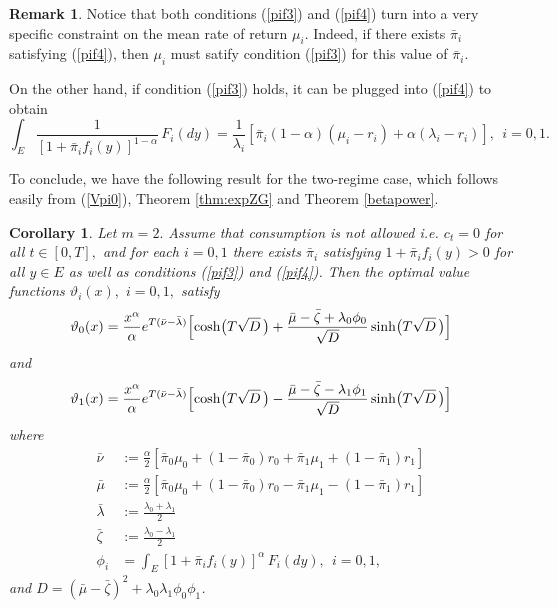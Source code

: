 \documentclass[11pt]{article}
\theoremstyle{plain}
\newtheorem{corollary}[theorem]{Corollary}
\theoremstyle{definition}
\newtheorem{remark}[theorem]{Remark}
\numberwithin{equation}{section}
\begin{document}
\begin{remark}
Notice that both conditions (\ref{pif3}) and (\ref{pif4}) turn into a very specific constraint on the mean rate of return $\mu_i.$ Indeed, if there exists $\bar\pi_i$ satisfying (\ref{pif4}), then $\mu_i$ must satify condition (\ref{pif3}) for this value of $\bar\pi_i.$

On the other hand, if condition (\ref{pif3}) holds, it can be plugged into (\ref{pif4}) to obtain
\begin{equation*}
\int_E \frac{1}{[1+\bar\pi_i f_i(y)]^{1-\alpha}}\,F_i(dy)=\frac{1}{\lambda_i}[\bar\pi_i(1-\alpha)(\mu_i-r_i)+\alpha(\lambda_i-r_i)], \ \ i=0,1.
\end{equation*}
\end{remark}

To conclude, we have the following result for the two-regime case, which follows easily from (\ref{Vpi0}), Theorem \ref{thm:expZG} and Theorem \ref{betapower}.
\begin{corollary}
Let $m=2.$ Assume that consumption is not allowed i.e. $c_t=0$ for all $t\in [0,T],$ and for each $i=0,1$ there exists $\bar{\pi}_i$ satisfying $1+\bar{\pi}_if_i(y)>0$ for all $y\in E$ as well as conditions (\ref{pif3}) and (\ref{pif4}).
Then the optimal value functions $\vartheta_i(x),$ $i=0,1,$ satisfy
\[
\vartheta_0(x)=\frac{x^\alpha}{\alpha}e^{T(\bar\nu-\bar\lambda)}\Bigl[\cosh\bigl(T\sqrt{D}\,\bigr)
+\frac{\bar\mu-\bar\zeta+\lambda_0\phi_0}{\sqrt{D}}\sinh\bigl(T\sqrt{D}\,\bigr)\Bigr]
\]
and
\[
\vartheta_1(x)=\frac{x^\alpha}{\alpha}e^{T(\bar\nu-\bar\lambda)}\Bigl[\cosh\bigl(T\sqrt{D}\,\bigr)
-\frac{\bar\mu-\bar\zeta-\lambda_1\phi_1}{\sqrt{D}}\sinh\bigl(T\sqrt{D}\,\bigr)\Bigr]
\]
where
\begin{align*}
\bar\nu &:=\frac{\alpha}{2}\left[\bar\pi_0\mu_0+(1-\bar\pi_0)r_0+\bar\pi_1\mu_1+(1-\bar\pi_1)r_1\right]\\
\bar\mu &:=\frac{\alpha}{2}\left[\bar\pi_0\mu_0+(1-\bar\pi_0)r_0-\bar\pi_1\mu_1-(1-\bar\pi_1)r_1\right]\\
\bar\lambda &:=\frac{\lambda_0+\lambda_1}{2}\\
\bar\zeta &:=\frac{\lambda_0-\lambda_1}{2}\\
\phi_i&=\int_E[1+\bar\pi_i f_i(y)]^\alpha\,F_i(dy), \ \ i=0,1,
\end{align*}
and $D=(\bar\mu-\bar\zeta)^2+\lambda_0\lambda_1\phi_0\phi_1$.

\end{corollary}
\end{document}
